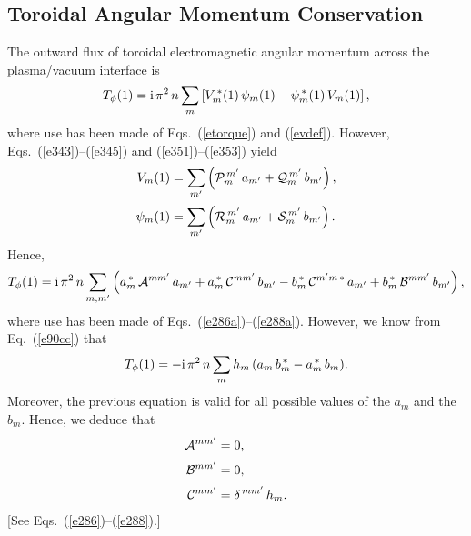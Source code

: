 \documentclass[12pt,prb,aps]{revtex4-1}
\begin{document}
\subsection{Toroidal Angular Momentum Conservation}\label{acons}
The outward flux of toroidal electromagnetic angular momentum across the plasma/vacuum interface is
\begin{equation}
T_\phi(1) = {\rm i}\,\pi^2\,n\sum_m\left[V_m^{\,\ast}(1)\,\psi_m(1)-\psi_m^{\,\ast}(1)\,V_m(1)\right],
\end{equation}
where use has been made of Eqs.~(\ref{etorque}) and (\ref{evdef}). However,
Eqs.~(\ref{e343})--(\ref{e345}) and (\ref{e351})--(\ref{e353}) yield
\begin{align}
V_m(1)&= \sum_{m'}\left({\cal P}_m^{\,m'} \,a_{m'}+ {\cal Q}_{m}^{\,m'}\,b_{m'}\right),\\[0.5ex]
\psi_m(1)& = \sum_{m'}\left({\cal R}_m^{\,m'}\,a_{m'} + {\cal S}_{m}^{\,m'}\,b_{m'}\right).
\end{align}
Hence, 
\begin{equation}
T_\phi(1) ={\rm i}\,\pi^2\,n\sum_{m,m'}\left(a_m^{\,\ast}\,{\cal A}^{mm'}\,a_{m'} + a_m^{\,\ast}\,{\cal C}^{mm'}\,b_{m'}-b_m^{\,\ast}\,{\cal C}^{m'm\,\ast}\,a_{m'}
+b_m^{\,\ast}\,{\cal B}^{mm'}\,b_{m'}\right),
\end{equation}
where use has been made of Eqs.~(\ref{e286a})--(\ref{e288a}). However, we know from 
Eq.~(\ref{e90cc}) that 
\begin{equation}
T_\phi(1) =- {\rm i}\,\pi^2\,n\sum_m h_m\,(a_m\,b_m^{\,\ast}-a_m^{\,\ast}\,b_m).
\end{equation}
Moreover, the previous equation is valid for all possible values of the $a_m$ and the $b_m$. Hence, we deduce that 
\begin{align}\label{e286x}
{\cal A}^{mm'}&= 0,\\[0.5ex]
{\cal B}^{mm'}&= 0,\\[0.5ex]
{\cal C}^{mm'}&= \delta^{\,mm'}\,h_m.\label{e288x}
\end{align}
[See Eqs.~(\ref{e286})--(\ref{e288}).]
\end{document}
